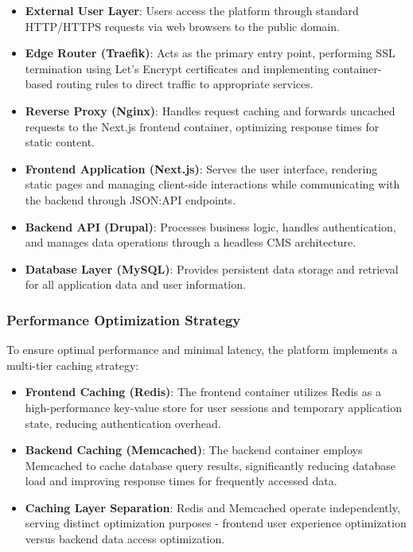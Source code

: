 \begin{itemize}
    \item \textbf{External User Layer}: Users access the platform through standard HTTP/HTTPS requests via web browsers to the public domain.
    
    \item \textbf{Edge Router (Traefik)}: Acts as the primary entry point, performing SSL termination using Let's Encrypt certificates and implementing container-based routing rules to direct traffic to appropriate services.
    
    \item \textbf{Reverse Proxy (Nginx)}: Handles request caching and forwards uncached requests to the Next.js frontend container, optimizing response times for static content.
    
    \item \textbf{Frontend Application (Next.js)}: Serves the user interface, rendering static pages and managing client-side interactions while communicating with the backend through JSON:API endpoints.
    
    \item \textbf{Backend API (Drupal)}: Processes business logic, handles authentication, and manages data operations through a headless CMS architecture.
    
    \item \textbf{Database Layer (MySQL)}: Provides persistent data storage and retrieval for all application data and user information.
\end{itemize}

\subsubsection{Performance Optimization Strategy}
To ensure optimal performance and minimal latency, the platform implements a multi-tier caching strategy:

\begin{itemize}
    \item \textbf{Frontend Caching (Redis)}: The frontend container utilizes Redis as a high-performance key-value store for user sessions and temporary application state, reducing authentication overhead.
    
    \item \textbf{Backend Caching (Memcached)}: The backend container employs Memcached to cache database query results, significantly reducing database load and improving response times for frequently accessed data.
    
    \item \textbf{Caching Layer Separation}: Redis and Memcached operate independently, serving distinct optimization purposes - frontend user experience optimization versus backend data access optimization.
\end{itemize}


